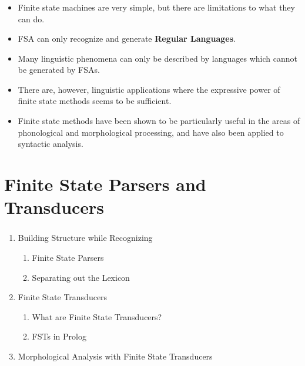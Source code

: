 \begin{frame}

	\frametitle{\insertsection}
	\framesubtitle{\insertsubsection}
	
	\begin{itemize}
		\item Finite state machines are very simple, but there are limitations to what they can do.
		\item FSA can only recognize and generate \textbf{Regular Languages}.
		\item Many linguistic phenomena can only be described by languages which cannot be generated by FSAs.
		\item There are, however, linguistic applications where the expressive power of finite state methods seems to be sufficient.
		\item Finite state methods have been shown to be particularly useful in the areas of phonological and morphological processing, and have also been applied to syntactic analysis.
	\end{itemize}

\end{frame}


\section{Finite State Parsers and Transducers}

\begin{frame}

	\begin{center}
		\Huge \insertsection
	\end{center}

\end{frame}


\begin{frame}

	\frametitle{\insertsection}
	
	\begin{enumerate}
	\item Building Structure while Recognizing
	\begin{enumerate}
		\item Finite State Parsers
		\item Separating out the Lexicon
	\end{enumerate}
	\item Finite State Transducers
	\begin{enumerate}
		\item What are Finite State Transducers?
		\item FSTs in Prolog
	\end{enumerate}
	\item Morphological Analysis with Finite State Transducers
	\end{enumerate}

\end{frame}

